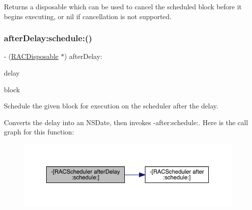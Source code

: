 Returns a disposable which can be used to cancel the scheduled block before it begins executing, or nil if cancellation is not supported. \mbox{\label{interface_r_a_c_scheduler_acc37181185138cba688a6e90da1a62fe}} 
\subsubsection{\texorpdfstring{after\+Delay\+:schedule\+:()}{afterDelay:schedule:()}\hspace{0.1cm}{\footnotesize\ttfamily [1/3]}}
{\footnotesize\ttfamily -\/ (\mbox{\hyperlink{interface_r_a_c_disposable}{R\+A\+C\+Disposable}} $\ast$) after\+Delay\+: \begin{DoxyParamCaption}\item[{(N\+S\+Time\+Interval)}]{delay }\item[{schedule:(void($^\wedge$)(void))}]{block }\end{DoxyParamCaption}}

Schedule the given block for execution on the scheduler after the delay.

Converts the delay into an N\+S\+Date, then invokes {\ttfamily -\/after\+:schedule\+:}. Here is the call graph for this function\+:\nopagebreak
\begin{figure}[H]
\begin{center}
\leavevmode
\includegraphics[width=350pt]{interface_r_a_c_scheduler_acc37181185138cba688a6e90da1a62fe_cgraph}
\end{center}
\end{figure}
\mbox{\label{interface_r_a_c_scheduler_acc37181185138cba688a6e90da1a62fe}} 
